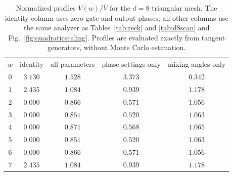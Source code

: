 \begin{table}[!htbp]
\centering
\begin{ruledtabular}
\begin{tabular}{ccccc}
$w$ & identity & all parameters & phase settings only & mixing angles only\\
\colrule
$0$ & $3.130$ & $1.528$ & $3.373$ & $0.342$\\
$1$ & $2.435$ & $1.084$ & $0.939$ & $1.178$\\
$2$ & $0.000$ & $0.866$ & $0.571$ & $1.056$\\
$3$ & $0.000$ & $0.851$ & $0.520$ & $1.063$\\
$4$ & $0.000$ & $0.871$ & $0.568$ & $1.065$\\
$5$ & $0.000$ & $0.851$ & $0.520$ & $1.063$\\
$6$ & $0.000$ & $0.866$ & $0.571$ & $1.056$\\
$7$ & $2.435$ & $1.084$ & $0.939$ & $1.178$\\
\end{tabular}
\end{ruledtabular}
\caption{Normalized profiles $V(w)/\overline V$ for the $d=8$ triangular mesh. The identity column uses zero gate and output phases; all other columns use the same analyzer as Tables~\ref{tab:reck} and \ref{tab:d8scan} and Fig.~\ref{fig:quadraticscaling}. Profiles are evaluated exactly from tangent generators, without Monte Carlo estimation.}
\label{tab:profiles}
\end{table}
